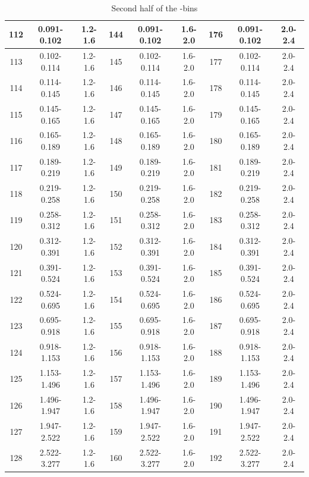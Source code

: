 \begin{table}[!p]
\begin{center}
\begin{tabular}{|c|c|c|c|c|c|c|c|c|}
112 & 0.091-0.102  & 1.2-1.6 & 144 & 0.091-0.102  & 1.6-2.0 & 176 & 0.091-0.102 & 2.0-2.4   \\ \hline         
113 & 0.102-0.114  & 1.2-1.6 & 145 & 0.102-0.114  & 1.6-2.0 & 177 & 0.102-0.114 & 2.0-2.4   \\ \hline         
114 & 0.114-0.145  & 1.2-1.6 & 146 & 0.114-0.145  & 1.6-2.0 & 178 & 0.114-0.145 & 2.0-2.4   \\ \hline         
115 & 0.145-0.165  & 1.2-1.6 & 147 & 0.145-0.165  & 1.6-2.0 & 179 & 0.145-0.165 & 2.0-2.4   \\ \hline         
116 & 0.165-0.189  & 1.2-1.6 & 148 & 0.165-0.189  & 1.6-2.0 & 180 & 0.165-0.189 & 2.0-2.4   \\ \hline         
117 & 0.189-0.219  & 1.2-1.6 & 149 & 0.189-0.219  & 1.6-2.0 & 181 & 0.189-0.219 & 2.0-2.4   \\ \hline         
118 & 0.219-0.258  & 1.2-1.6 & 150 & 0.219-0.258  & 1.6-2.0 & 182 & 0.219-0.258 & 2.0-2.4   \\ \hline         
119 & 0.258-0.312  & 1.2-1.6 & 151 & 0.258-0.312  & 1.6-2.0 & 183 & 0.258-0.312 & 2.0-2.4   \\ \hline         
120 & 0.312-0.391  & 1.2-1.6 & 152 & 0.312-0.391  & 1.6-2.0 & 184 & 0.312-0.391 & 2.0-2.4   \\ \hline         
121 & 0.391-0.524  & 1.2-1.6 & 153 & 0.391-0.524  & 1.6-2.0 & 185 & 0.391-0.524 & 2.0-2.4   \\ \hline         
122 & 0.524-0.695  & 1.2-1.6 & 154 & 0.524-0.695  & 1.6-2.0 & 186 & 0.524-0.695 & 2.0-2.4   \\ \hline         
123 & 0.695-0.918  & 1.2-1.6 & 155 & 0.695-0.918  & 1.6-2.0 & 187 & 0.695-0.918 & 2.0-2.4   \\ \hline         
124 & 0.918-1.153  & 1.2-1.6 & 156 & 0.918-1.153  & 1.6-2.0 & 188 & 0.918-1.153 & 2.0-2.4   \\ \hline         
125 & 1.153-1.496  & 1.2-1.6 & 157 & 1.153-1.496  & 1.6-2.0 & 189 & 1.153-1.496 & 2.0-2.4   \\ \hline         
126 & 1.496-1.947  & 1.2-1.6 & 158 & 1.496-1.947  & 1.6-2.0 & 190 & 1.496-1.947 & 2.0-2.4   \\ \hline         
127 & 1.947-2.522  & 1.2-1.6 & 159 & 1.947-2.522  & 1.6-2.0 & 191 & 1.947-2.522 & 2.0-2.4   \\ \hline
128 & 2.522-3.277  & 1.2-1.6 & 160 & 2.522-3.277  & 1.6-2.0 & 192 & 2.522-3.277 & 2.0-2.4   \\ \hline



\end{tabular}
\end{center}
\caption[Other half of the 2D bin definitions]{Second half of the \phistar-\rapidity bins }
\label{table:phistarAndEtaBins2}
\end{table}





